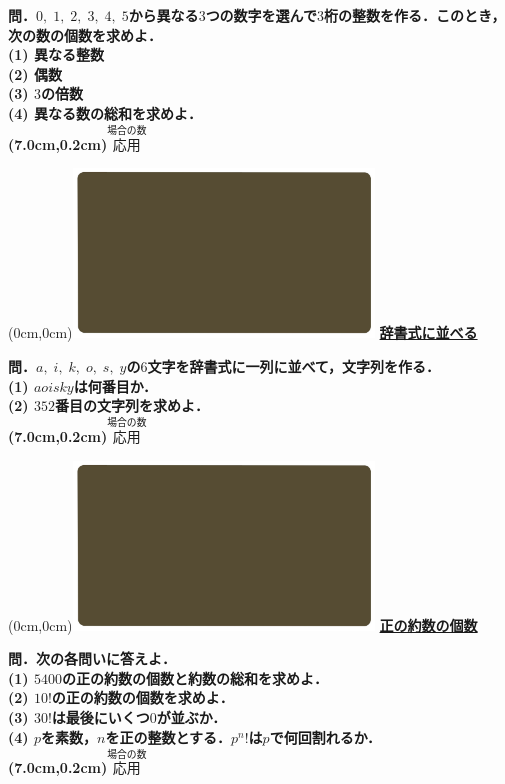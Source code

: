 \documentclass[10pt,
fleqn,
dvipdfmx,
uplatex
]{jsarticle}
\begin{document}
\normalsize 
\bf\boldmath 問．$0,\;1,\;2,\;3,\;4,\;5$から異なる$3$つの数字を選んで$3$桁の整数を作る．このとき，次の数の個数を求めよ．\\
(1)  異なる整数\\
(2)  偶数\\
(3)  $3$の倍数\\
(4)  異なる数の総和を求めよ．\\

\at(7.0cm,0.2cm){\small\color{bradorange}$\overset{\text{場合の数}}{\text{応用}}$}


\newpage



\at(0cm,0cm){\includegraphics[width=8cm,bb=0 0 1920 1080]{./youtube/thumbnails/templates/smart_background/場合の数.jpeg}}
{\color{orange}\bf\boldmath\huge\underline{辞書式に並べる}}\vspace{0.3zw}

\Large 
\bf\boldmath 問．$a,\;i,\;k,\;o,\;s,\;y$の$6$文字を辞書式に一列に並べて，文字列を作る．\\
(1)  $aoisky$は何番目か．\\
(2)  ${352}$番目の文字列を求めよ．\\

\at(7.0cm,0.2cm){\small\color{bradorange}$\overset{\text{場合の数}}{\text{応用}}$}


\newpage



\at(0cm,0cm){\includegraphics[width=8cm,bb=0 0 1920 1080]{./youtube/thumbnails/templates/smart_background/場合の数.jpeg}}
{\color{orange}\bf\boldmath\huge\underline{正の約数の個数}}\vspace{0.3zw}

\normalsize 
\bf\boldmath 問．次の各問いに答えよ．\\
(1)  ${5400}$の正の約数の個数と約数の総和を求めよ．\\
(2)  ${10}!$の正の約数の個数を求めよ．\\
(3)  ${30}!$は最後にいくつ$0$が並ぶか．\\
(4)  $p$を素数，$n$を正の整数とする．$p^n!$は$p$で何回割れるか．\\

\at(7.0cm,0.2cm){\small\color{bradorange}$\overset{\text{場合の数}}{\text{応用}}$}
\end{document}
